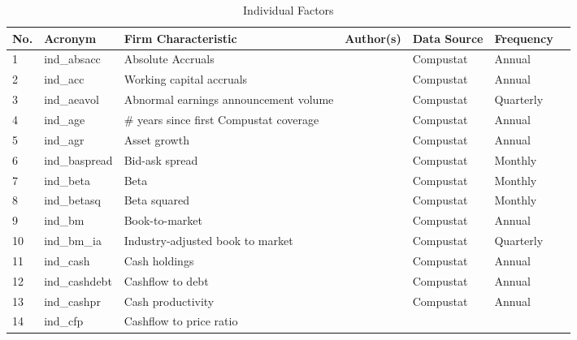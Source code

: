 \documentclass[a4paper, table]{article}
\begin{document}
\begin{landscape}
	\begin{center}
		\label{ind_factors}
		\begin{longtable}{lllllll}
			\caption{Individual Factors} \\ \hline
			No. & Acronym & Firm Characteristic & Author(s) & Data Source & Frequency \\ \hline
			1 & ind\_absacc\footnotemark[\value{footnote}] & Absolute Accruals & 
				\cite{bandyopadhyay_accrual_2010} & Compustat & Annual \\
			2 & ind\_acc\footnotemark[\value{footnote}] & Working capital accruals & 
				\cite{sloan_stock_1996} & Compustat & Annual \\
			3 & ind\_aeavol & Abnormal earnings announcement volume & 
				\cite{lerman_high-volume_2008} & Compustat & Quarterly \\
			4 & ind\_age & \# years since first Compustat coverage & 
				\cite{jiang_information_2005} & Compustat & Annual \\
			5 & ind\_agr & Asset growth & 
				\cite{cooper_asset_2008} & Compustat & Annual \\
			6 & ind\_baspread & Bid-ask spread & 
				\cite{amihud_effects_1989} & Compustat & Monthly \\
			7 & ind\_beta & Beta & 
				\cite{fama_risk_1973} & Compustat & Monthly \\
			8 & ind\_betasq & Beta squared & 
				\cite{fama_risk_1973} & Compustat & Monthly \\
			9 & ind\_bm & Book-to-market & 
				\cite{rosenberg_persuasive_1985} & Compustat & Annual \\
			10 & ind\_bm\_ia & Industry-adjusted book to market & 
				\cite{asness_predicting_2000} & Compustat & Quarterly \\
			11 & ind\_cash & Cash holdings & 
				\cite{palazzo_cash_2012} & Compustat & Annual \\
			12 & ind\_cashdebt & Cashflow to debt & 
				\cite{ou_financial_1989} & Compustat & Annual \\
			13 & ind\_cashpr & Cash productivity & 
				\cite{chandrashekar_productivity_2009} & Compustat & Annual \\
			14 & ind\_cfp\footnotemark[\value{footnote}] & Cashflow to price ratio & 

\end{longtable}
\end{center}
\end{landscape}
\end{document}
